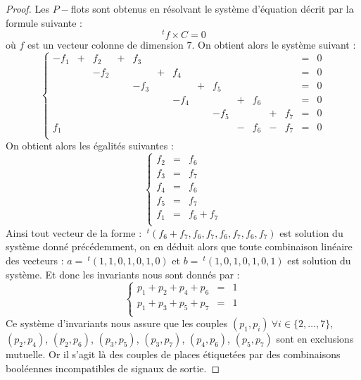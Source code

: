 \begin{proof}
    Les $P-$flots sont obtenus en résolvant le système d'équation décrit par la formule suivante : 
    \begin{displaymath}
        ~^tf \times C = 0
    \end{displaymath}
    où $f$ est un vecteur colonne de dimension 7. On obtient alors le système suivant :
    \begin{displaymath}
        \left \{ \begin{array}{ccccccccccccccl}
            -f_1 & + &  f_2 & + &  f_3 &   &      &   &      &   &      &   &      & = & 0\\
                 &   & -f_2 &   &      & + &  f_4 &   &      &   &      &   &      & = & 0\\
                 &   &      &   & -f_3 &   &      & + &  f_5 &   &      &   &      & = & 0\\
                 &   &      &   &      &   & -f_4 &   &      & + &  f_6 &   &      & = & 0\\
                 &   &      &   &      &   &      &   & -f_5 &   &      & + &  f_7 & = & 0\\
             f_1 &   &      &   &      &   &      &   &      & - &  f_6 & - &  f_7 & = & 0\\
        \end{array}
        \right .
    \end{displaymath}
    On obtient alors les égalités suivantes :
    \begin{displaymath}
        \left \{
        \begin{array}{rcl}
            f_2 & = & f_6 \\
            f_3 & = & f_7 \\
            f_4 & = & f_6 \\
            f_5 & = & f_7 \\
            f_1 & = & f_6 + f_7\\
        \end{array}
        \right .
    \end{displaymath}
    Ainsi tout vecteur de la forme : $~^t(f_6 + f_7, f_6, f_7, f_6, f_7, f_6, f_7)$ est solution du
    système donné précédemment, on en déduit alors que toute combinaison linéaire des vecteurs : $a
    = ~^t(1, 1, 0, 1, 0, 1, 0)$ et $b = ~^t(1, 0, 1, 0, 1, 0, 1)$ est solution du système. Et donc
    les invariants nous sont donnés par : \begin{displaymath}
        \left \{ \begin{array}{rcl}
            p_1 + p_2 + p_4 + p_6 & = & 1 \\
            p_1 + p_3 + p_5 + p_7 & = & 1 \\
        \end{array}
        \right .
    \end{displaymath}
    Ce système d'invariants nous assure que les couples $(p_1, p_i)\ \forall i \in \{2, \dots, 7\},$
    $(p_2, p_4)$, $(p_2, p_6)$, $(p_3, p_5)$, $(p_3, p_7)$, $(p_4, p_6)$, $(p_5, p_7)$ sont en exclusions
    mutuelle. Or il s'agit là des couples de places étiquetées par des combinaisons booléennes
    incompatibles de signaux de sortie.
\end{proof}

